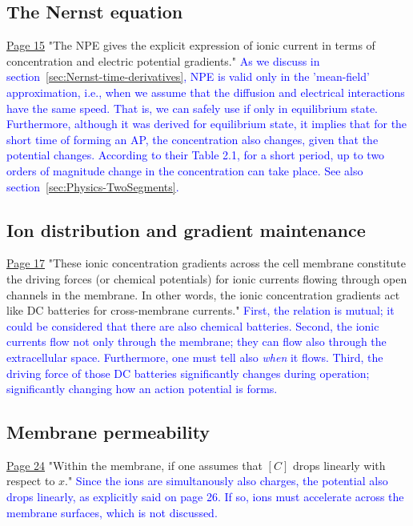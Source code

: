 \subsection{The Nernst equation\label{sec:Physics-NernstEquation}}
\href{https://rcweb.dartmouth.edu/~mvdm/wiki/lib/exe/fetch.php?media=analysis:johnstonwu.pdf}{Page 15} "The NPE gives the explicit expression of ionic current in terms of concentration and electric potential gradients." \textcolor{blue}{As we discuss in section~\ref{sec:Nernst-time-derivatives}, NPE is valid only in the 'mean-field' approximation, i.e., when we assume that the diffusion and electrical interactions have the same speed. That is, we can safely use if only in equilibrium state. Furthermore, although it was derived for equilibrium state, it implies that for the short time of forming an
AP, the concentration also changes, given that the potential changes. According to their Table 2.1, for a short period, up to two orders of magnitude change in the
concentration can take place. See also section~\ref{sec:Physics-TwoSegments}.
}

\subsection{Ion distribution and gradient maintenance\label{sec:Physics-IonDistribution}}
\href{https://rcweb.dartmouth.edu/~mvdm/wiki/lib/exe/fetch.php?media=analysis:johnstonwu.pdf}{Page 17} "These ionic concentration gradients across the cell membrane constitute the driving forces
(or chemical potentials) for ionic currents flowing through open channels
in the membrane. In other words, the ionic concentration gradients act
like DC batteries for cross-membrane currents."
\textcolor{blue}{First, the relation is mutual; it could be considered that
there are also chemical batteries. Second, the  ionic currents flow not only through the membrane; they can flow also through the extracellular space. Furthermore, one must tell also \textit{when} it flows. Third, the driving force
of those DC batteries significantly changes during operation; significantly changing how an action potential is forms.
}

\subsection{Membrane permeability\label{sec:Physics-MembranePermeability}}
\href{https://rcweb.dartmouth.edu/~mvdm/wiki/lib/exe/fetch.php?media=analysis:johnstonwu.pdf}{Page 24} "Within the membrane, if one assumes that $[C]$ drops linearly with respect to $x$." \textcolor{blue}{Since the ions are simultanously also charges, the potential also drops linearly, as explicitly said on page 26. If so, ions must accelerate across the membrane surfaces, which is not discussed.}
